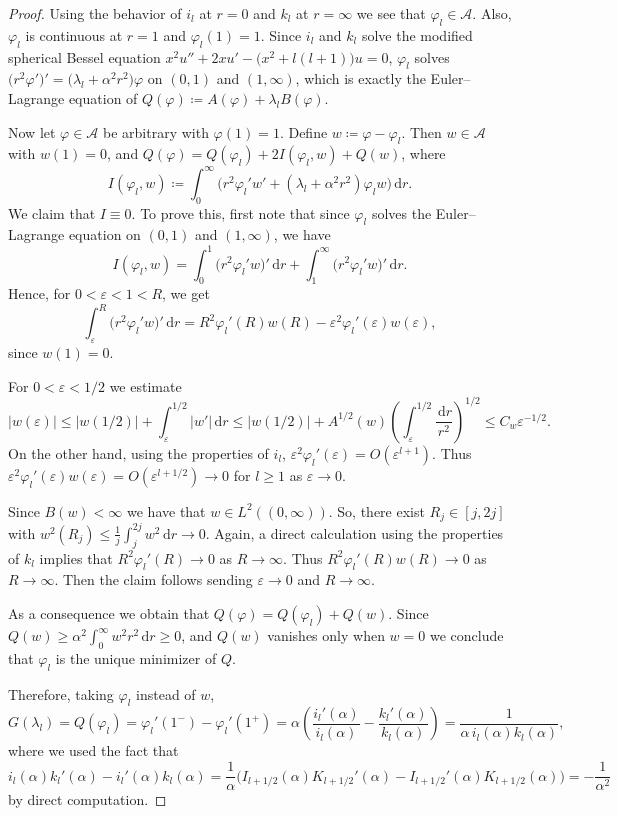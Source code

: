 \documentclass[10pt,a4paper]{amsart}
\newcommand{\dd}{\,\mathrm{d}}
\newcommand{\defeq}{\coloneqq}
\newcommand{\e}{\varepsilon}
\renewcommand{\geq}{\geqslant}
\renewcommand{\leq}{\leqslant}
\begin{document}
\begin{proof}
Using the behavior of $i_l$ at $r=0$ and $k_l$ at $r=\infty$ we see that $\varphi_l \in \mathscr{A}$. Also, $\varphi_l$ is continuous at $r=1$ and $\varphi_l(1)=1$. Since $i_l$ and $k_l$ solve the modified spherical Bessel equation $x^2u'' +2xu'-\big(x^2+l(l+1)\big)u=0$, $\varphi_l$ solves $\big(r^2\varphi'\big)'=\big(\lambda_l+\alpha^2r^2\big)\varphi$ on $(0,1)$ and $(1,\infty)$, which is exactly the Euler--Lagrange equation of $Q(\varphi)\defeq A(\varphi)+\lambda_l B(\varphi)$.

Now let $\varphi\in\mathscr{A}$ be arbitrary with $\varphi(1)=1$. Define $w\defeq\varphi-\varphi_l$. Then $w\in\mathscr{A}$ with $w(1)=0$, and $Q(\varphi)=Q(\varphi_l)+2I(\varphi_l,w)+Q(w)$, where
	\[
		I(\varphi_l,w) \defeq \int_0^\infty \big(r^2\varphi_l'w'+(\lambda_l+\alpha^2r^2)\varphi_l w\big)\dd r. 
	\]
We claim that $I \equiv 0$. To prove this, first note that since $\varphi_l$ solves the Euler--Lagrange equation on $(0,1)$ and $(1,\infty)$, we have
	\[
		I(\varphi_l,w) = \int_0^1 \big(r^2\varphi_l'w\big)'\dd r + \int_1^\infty \big(r^2\varphi_l'w\big)'\dd r.
	\]
Hence, for $0<\e<1<R$, we get
	\[
		\int_{\e}^R \big(r^2\varphi_l'w\big)'\dd r = R^2 \varphi_l'(R)w(R) - \e^2\varphi_l'(\e)w(\e),
	\]
since $w(1)=0$.

For $0<\e<1/2$ we estimate
	\[
		|w(\e)| \leq |w(1/2)| + \int_{\e}^{1/2} |w'|\dd r \leq |w(1/2)| + A^{1/2}(w)\left(\int_{\e}^{1/2}\frac{\dd r}{r^2}\right)^{1/2} \leq C_w \e^{-1/2}.
	\]
On the other hand, using the properties of $i_l$, $\e^2 \varphi_l'(\e)=O(\e^{l+1})$. Thus $\e^2\varphi_l'(\e)w(\e) = O(\e^{l+1/2})\to 0$ for $l\geq 1$ as $\e\to 0$.

Since $B(w)<\infty$ we have that $w\in L^2((0,\infty))$. So, there exist $R_j \in [j,2j]$ with $w^2(R_j) \leq \frac{1}{j}\int_j^{2j} w^2\dd r \to 0$. Again, a direct calculation using the properties of $k_l$ implies that $R^2\varphi_l'(R)\to 0$ as $R\to \infty$. Thus $R^2 \varphi_l'(R)w(R)\to 0$ as $R\to\infty$. Then the claim follows sending $\e\to 0$ and $R\to \infty$.

As a consequence we obtain that $Q(\varphi)=Q(\varphi_l)+Q(w)$. Since $Q(w) \geq \alpha^2\int_0^\infty w^2 r^2\dd r \geq 0$, and $Q(w)$ vanishes only when $w=0$ we conclude that $\varphi_l$ is the unique minimizer of $Q$.

Therefore, taking $\varphi_l$ instead of $w$,
	\[
		G(\lambda_l) = Q(\varphi_l) = \varphi_l'(1^-) - \varphi_l'(1^+) = \alpha \left(\frac{i_l'(\alpha)}{i_l(\alpha)}-\frac{k_l'(\alpha)}{k_l(\alpha)}\right) =\frac{1}{\alpha\,i_l(\alpha)k_l(\alpha)},
	\]
where we used the fact that 
	\[
		i_l(\alpha)k_l'(\alpha) - i_l'(\alpha)k_l(\alpha) = \frac{1}{\alpha}\big(I_{l+1/2}(\alpha)K_{l+1/2}'(\alpha) - I_{l+1/2}'(\alpha)K_{l+1/2}(\alpha)\big) = -\frac{1}{\alpha^2}
	\]
by direct computation.
\end{proof}
\end{document}
